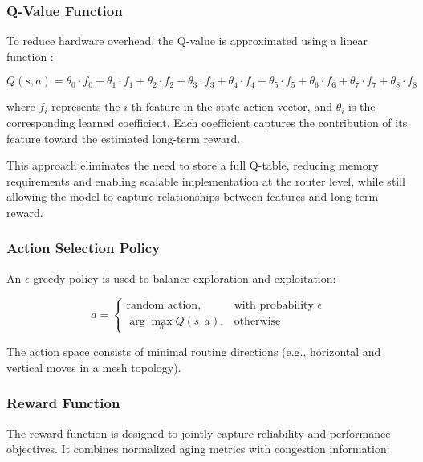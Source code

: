 \subsubsection{Q-Value Function}

To reduce hardware overhead, the Q-value is approximated using a linear function \cite{LARE2023}:

\begin{equation}
Q(s,a) = \theta_0 \cdot f_0 + \theta_1 \cdot f_1 + \theta_2 \cdot f_2 + \theta_3 \cdot f_3 + \theta_4 \cdot f_4 + \theta_5 \cdot f_5 + \theta_6 \cdot f_6 + \theta_7 \cdot f_7 + \theta_8 \cdot f_8
\end{equation}

where $f_i$ represents the $i$-th feature in the state-action vector, and $\theta_i$ is the corresponding learned coefficient. Each coefficient captures the contribution of its feature toward the estimated long-term reward.

This approach eliminates the need to store a full Q-table, reducing memory requirements and enabling scalable implementation at the router level, while still allowing the model to capture relationships between features and long-term reward.

\subsubsection{Action Selection Policy}

An $\epsilon$-greedy policy is used to balance exploration and exploitation:

\begin{equation}
a =
\begin{cases}
\text{random action}, & \text{with probability } \epsilon \\
\arg\max_a Q(s,a), & \text{otherwise}
\end{cases}
\end{equation}

The action space consists of minimal routing directions (e.g., horizontal and vertical moves in a mesh topology).

\subsubsection{Reward Function}

The reward function is designed to jointly capture reliability and performance objectives. It combines normalized aging metrics with congestion information:


